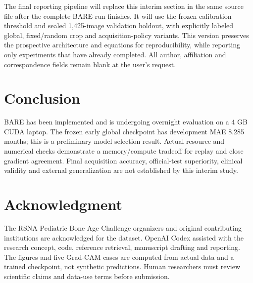 \documentclass[nolineno]{ieeeaccess}
\begin{document}
The final reporting pipeline will replace this interim section in the same source file after the complete BARE run finishes. It will use the frozen calibration threshold and sealed 1,425-image validation holdout, with explicitly labeled global, fixed/random crop and acquisition-policy variants. This version preserves the prospective architecture and equations for reproducibility, while reporting only experiments that have already completed. All author, affiliation and correspondence fields remain blank at the user's request.

\section{Conclusion}
BARE has been implemented and is undergoing overnight evaluation on a 4 GB CUDA laptop. The frozen early global checkpoint has development MAE 8.285 months; this is a preliminary model-selection result. Actual resource and numerical checks demonstrate a memory/compute tradeoff for replay and close gradient agreement. Final acquisition accuracy, official-test superiority, clinical validity and external generalization are not established by this interim study.

\section*{Acknowledgment}
The RSNA Pediatric Bone Age Challenge organizers and original contributing institutions are acknowledged for the dataset. OpenAI Codex assisted with the research concept, code, reference retrieval, manuscript drafting and reporting. The figures and five Grad-CAM cases are computed from actual data and a trained checkpoint, not synthetic predictions. Human researchers must review scientific claims and data-use terms before submission.

\EOD
\end{document}
